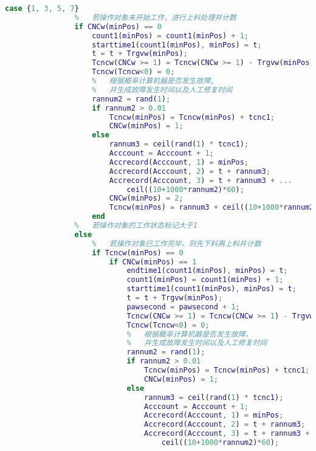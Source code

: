 \documentclass[no-math,withoutpreface,bwprint]{cumcmthesis} %
\numberwithin{equation}{section}
\numberwithin{figure}{section}
\numberwithin{table}{section}
\begin{document}
\begin{lstlisting}[language=matlab]
            case {1, 3, 5, 7}
                %   若操作对象未开始工作，进行上料处理并计数
                if CNCw(minPos) == 0
                    count1(minPos) = count1(minPos) + 1;
                    starttime1(count1(minPos), minPos) = t;
                    t = t + Trgvw(minPos);
                    Tcncw(CNCw >= 1) = Tcncw(CNCw >= 1) - Trgvw(minPos);
                    Tcncw(Tcncw<0) = 0;
                    %   根据概率计算机器是否发生故障,
                    %   并生成故障发生时间以及人工修复时间
                    rannum2 = rand(1);
                    if rannum2 > 0.01
                        Tcncw(minPos) = Tcncw(minPos) + tcnc1;
                        CNCw(minPos) = 1;
                    else
                        rannum3 = ceil(rand(1) * tcnc1);
                        Acccount = Acccount + 1;
                        Accrecord(Acccount, 1) = minPos;
                        Accrecord(Acccount, 2) = t + rannum3;
                        Accrecord(Acccount, 3) = t + rannum3 + ...
                            ceil((10+1000*rannum2)*60);
                        CNCw(minPos) = 2;
                        Tcncw(minPos) = rannum3 + ceil((10+1000*rannum2)*60);
                    end
                %   若操作对象的工作状态标记大于1
                else
                    %   若操作对象已工作完毕，则先下料再上料并计数
                    if Tcncw(minPos) == 0
                        if CNCw(minPos) == 1
                            endtime1(count1(minPos), minPos) = t;
                            count1(minPos) = count1(minPos) + 1;
                            starttime1(count1(minPos), minPos) = t;
                            t = t + Trgvw(minPos);
                            pawsecond = pawsecond + 1;
                            Tcncw(CNCw >= 1) = Tcncw(CNCw >= 1) - Trgvw(minPos);
                            Tcncw(Tcncw<0) = 0;
                            %   根据概率计算机器是否发生故障，
                            %   并生成故障发生时间以及人工修复时间
                            rannum2 = rand(1);
                            if rannum2 > 0.01
                                Tcncw(minPos) = Tcncw(minPos) + tcnc1;
                                CNCw(minPos) = 1;
                            else
                                rannum3 = ceil(rand(1) * tcnc1);
                                Acccount = Acccount + 1;
                                Accrecord(Acccount, 1) = minPos;
                                Accrecord(Acccount, 2) = t + rannum3;
                                Accrecord(Acccount, 3) = t + rannum3 + ...
                                    ceil((10+1000*rannum2)*60);

\end{lstlisting}
\end{document}
